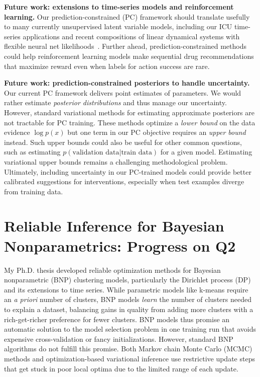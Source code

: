 \documentclass[11pt,letterpaper]{article}
\begin{document}
\textbf{Future work: extensions to time-series models and reinforcement learning.}
Our prediction-constrained (PC) framework should translate usefully to many currently unsupervised latent variable models, including our ICU time-series applications and recent compositions of linear dynamical systems with flexible neural net likelihoods~\citep{johnson2016svae}. 
Further ahead, prediction-constrained methods could help reinforcement learning models make sequential drug recommendations that maximize reward even when labels for action success are rare.

\textbf{Future work: prediction-constrained posteriors to handle uncertainty.}
Our current PC framework delivers point estimates of parameters.
We would rather estimate \emph{posterior distributions} and thus manage our uncertainty. However, standard variational methods for estimating approximate posteriors are not tractable for PC training. These methods optimize a \emph{lower bound} on the data evidence $\log p(x)$ but one term in our PC objective requires an \emph{upper bound} instead. Such upper bounds could also be useful for other common questions, such as estimating $p(\text{validation data} | \text{train data})$ for a given model.
Estimating variational upper bounds remains a challenging methodological problem.
Ultimately, including uncertainty in our PC-trained models could provide better calibrated suggestions for interventions, especially when test examples diverge from training data.


\section*{Reliable Inference for Bayesian Nonparametrics: Progress on Q2}

My Ph.D. thesis developed reliable optimization methods for Bayesian nonparametric (BNP) clustering models, particularly the Dirichlet process (DP) and its extensions to time series. 
While parametric models like k-means require an \emph{a priori} number of clusters,
BNP models \emph{learn} the number of clusters needed to explain a dataset,
balancing gains in quality from adding more clusters with a rich-get-richer preference for fewer clusters.
BNP models thus promise an automatic solution to the model selection problem in one training run that avoids expensive cross-validation or fancy initializations. 
However, standard BNP algorithms do not fulfill this promise. Both Markov chain Monte Carlo (MCMC) methods and optimization-based variational inference use restrictive update steps that get stuck in poor local optima due to the limited range of each update.
\end{document}
